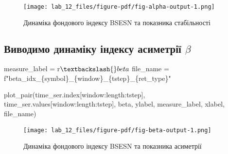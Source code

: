 \documentclass[
  letterpaper,
]{report}
\newenvironment{Shaded}{\begin{snugshade}}{\end{snugshade}}
\newcommand{\NormalTok}[1]{\textcolor[rgb]{0.00,0.23,0.31}{#1}}
\newcommand{\OperatorTok}[1]{\textcolor[rgb]{0.37,0.37,0.37}{#1}}
\newcommand{\SpecialCharTok}[1]{\textcolor[rgb]{0.37,0.37,0.37}{#1}}
\newcommand{\SpecialStringTok}[1]{\textcolor[rgb]{0.13,0.47,0.30}{#1}}
\newcommand{\VerbatimStringTok}[1]{\textcolor[rgb]{0.13,0.47,0.30}{#1}}
\begin{document}
\begin{figure}[H]

{\centering \texttt{[image: lab\_12\_files/figure-pdf/fig-alpha-output-1.png]}

}

\caption{\label{fig-alpha}Динаміка фондового індексу BSESN та показника
стабільності}

\end{figure}

\hypertarget{ux432ux438ux432ux43eux434ux438ux43cux43e-ux434ux438ux43dux430ux43cux456ux43aux443-ux456ux43dux434ux435ux43aux441ux443-ux430ux441ux438ux43cux435ux442ux440ux456ux457-beta}{%
\subsection{\texorpdfstring{Виводимо динаміку індексу асиметрії
\(\beta\)}{Виводимо динаміку індексу асиметрії \textbackslash beta}}\label{ux432ux438ux432ux43eux434ux438ux43cux43e-ux434ux438ux43dux430ux43cux456ux43aux443-ux456ux43dux434ux435ux43aux441ux443-ux430ux441ux438ux43cux435ux442ux440ux456ux457-beta}}

\begin{Shaded}
\begin{Highlighting}[]
\NormalTok{measure\_label }\OperatorTok{=} \VerbatimStringTok{r\textquotesingle{}$\textbackslash{}beta$\textquotesingle{}}
\NormalTok{file\_name }\OperatorTok{=} \SpecialStringTok{f"beta\_idx\_}\SpecialCharTok{\{}\NormalTok{symbol}\SpecialCharTok{\}}\SpecialStringTok{\_}\SpecialCharTok{\{}\NormalTok{window}\SpecialCharTok{\}}\SpecialStringTok{\_}\SpecialCharTok{\{}\NormalTok{tstep}\SpecialCharTok{\}}\SpecialStringTok{\_}\SpecialCharTok{\{}\NormalTok{ret\_type}\SpecialCharTok{\}}\SpecialStringTok{"}
\end{Highlighting}
\end{Shaded}

\begin{Shaded}
\begin{Highlighting}[]
\NormalTok{plot\_pair(time\_ser.index[window:length:tstep],}
\NormalTok{          time\_ser.values[window:length:tstep],}
\NormalTok{          beta, }
\NormalTok{          ylabel, }
\NormalTok{          measure\_label,}
\NormalTok{          xlabel,}
\NormalTok{          file\_name)}
\end{Highlighting}
\end{Shaded}

\begin{figure}[H]

{\centering \texttt{[image: lab\_12\_files/figure-pdf/fig-beta-output-1.png]}

}

\caption{\label{fig-beta}Динаміка фондового індексу BSESN та показника
асиметрії}

\end{figure}
\end{document}
